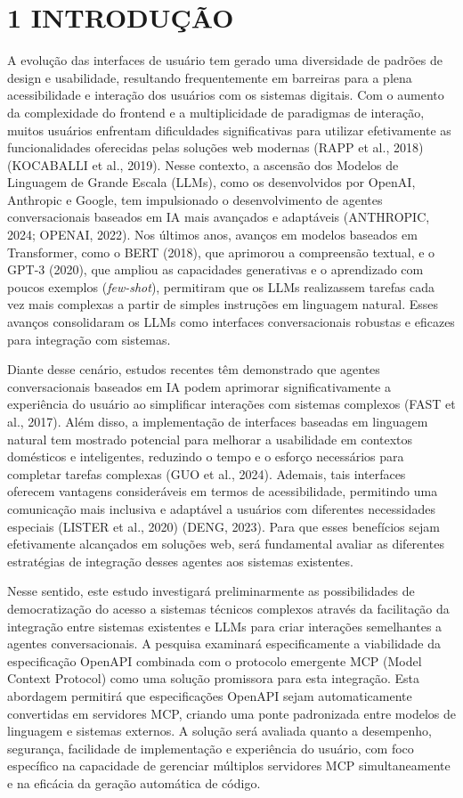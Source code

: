 \documentclass[
]{article}
\begin{document}
\section{1 INTRODUÇÃO}\label{introduuxe7uxe3o}

A evolução das interfaces de usuário tem gerado uma diversidade de
padrões de design e usabilidade, resultando frequentemente em barreiras
para a plena acessibilidade e interação dos usuários com os sistemas
digitais. Com o aumento da complexidade do frontend e a multiplicidade
de paradigmas de interação, muitos usuários enfrentam dificuldades
significativas para utilizar efetivamente as funcionalidades oferecidas
pelas soluções web modernas (RAPP et al., 2018) (KOCABALLI et al.,
2019). Nesse contexto, a ascensão dos Modelos de Linguagem de Grande
Escala (LLMs), como os desenvolvidos por OpenAI, Anthropic e Google, tem
impulsionado o desenvolvimento de agentes conversacionais baseados em IA
mais avançados e adaptáveis (ANTHROPIC, 2024; OPENAI, 2022). Nos últimos
anos, avanços em modelos baseados em Transformer, como o BERT (2018),
que aprimorou a compreensão textual, e o GPT-3 (2020), que ampliou as
capacidades generativas e o aprendizado com poucos exemplos
(\emph{few-shot}), permitiram que os LLMs realizassem tarefas cada vez
mais complexas a partir de simples instruções em linguagem natural.
Esses avanços consolidaram os LLMs como interfaces conversacionais
robustas e eficazes para integração com sistemas.

Diante desse cenário, estudos recentes têm demonstrado que agentes
conversacionais baseados em IA podem aprimorar significativamente a
experiência do usuário ao simplificar interações com sistemas complexos
(FAST et al., 2017). Além disso, a implementação de interfaces baseadas
em linguagem natural tem mostrado potencial para melhorar a usabilidade
em contextos domésticos e inteligentes, reduzindo o tempo e o esforço
necessários para completar tarefas complexas (GUO et al., 2024).
Ademais, tais interfaces oferecem vantagens consideráveis em termos de
acessibilidade, permitindo uma comunicação mais inclusiva e adaptável a
usuários com diferentes necessidades especiais (LISTER et al., 2020)
(DENG, 2023). Para que esses benefícios sejam efetivamente alcançados em
soluções web, será fundamental avaliar as diferentes estratégias de
integração desses agentes aos sistemas existentes.

Nesse sentido, este estudo investigará preliminarmente as possibilidades
de democratização do acesso a sistemas técnicos complexos através da
facilitação da integração entre sistemas existentes e LLMs para criar
interações semelhantes a agentes conversacionais. A pesquisa examinará
especificamente a viabilidade da especificação OpenAPI combinada com o
protocolo emergente MCP (Model Context Protocol) como uma solução
promissora para esta integração. Esta abordagem permitirá que
especificações OpenAPI sejam automaticamente convertidas em servidores
MCP, criando uma ponte padronizada entre modelos de linguagem e sistemas
externos. A solução será avaliada quanto a desempenho, segurança,
facilidade de implementação e experiência do usuário, com foco
específico na capacidade de gerenciar múltiplos servidores MCP
simultaneamente e na eficácia da geração automática de código.
\end{document}
